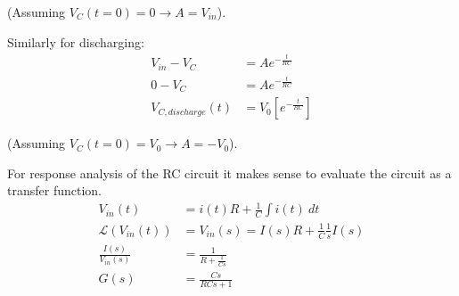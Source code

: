 \documentclass[11pt]{article}
\begin{document}
(Assuming $V_C(t=0)=0 \to A=V_{in}$).

Similarly for discharging:
\begin{subequations}
  \begin{align}
    V_{in} - V_C &= Ae^{-\frac{t}{RC}} \\
    0 - V_C &= Ae^{-\frac{t}{RC}} \\
    V_{C,discharge}(t) &= V_0\left[e^{-\frac{t}{RC}}\right]
  \end{align}
\end{subequations}

(Assuming $V_C(t=0)=V_0 \to A=-V_0$).

For response analysis of the RC circuit it makes sense to evaluate the circuit as a transfer function.
\begin{subequations}
  \begin{align}
    V_{in}(t) &= i(t) R + \frac{1}{C} \int i(t)~dt \\
    \mathcal{L}(V_{in}(t)) &= V_{in}(s) = I(s) R + \frac{1}{C}\frac{1}{s} I(s) \\
    \frac{I(s)}{V_{in}(s)} &= \frac{1}{R+\frac{1}{Cs}} \\
    G(s) &= \frac{Cs}{RCs + 1}
  \end{align}
\end{subequations}


\end{document}
